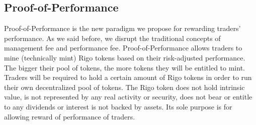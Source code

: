 \documentclass[9pt,oneside]{amsart}
\begin{document}
\begin{multicols}{2}
\section{Proof-of-Performance}
Proof-of-Performance is the new paradigm we propose for rewarding traders’ performance. As we said before, we disrupt the traditional concepts of management fee and performance fee. Proof-of-Performance allows traders to mine (technically mint) Rigo tokens based on their risk-adjusted performance. The bigger their pool of tokens, the more tokens they will be entitled to mint. Traders will be required to hold a certain amount of Rigo tokens in order to run their own decentralized pool of tokens.
The Rigo token does not hold intrinsic value, is not represented by any real activity or security, does not bear or entitle to any dividends or interest is not backed by assets. Its sole purpose is for allowing reward of performance of traders.


\end{multicols}
\end{document}
